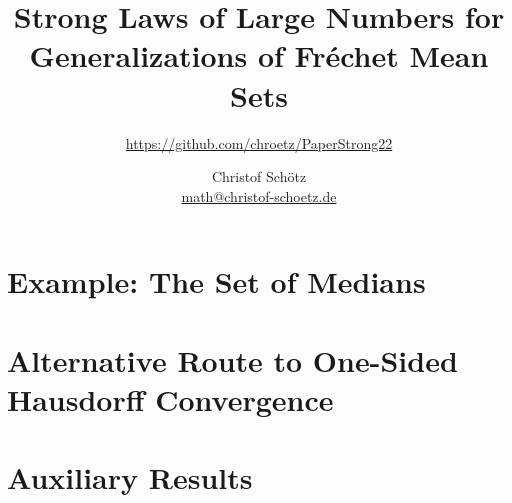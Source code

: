 \documentclass{scrartcl}
\theoremstyle{plain}%
\theoremstyle{definition}
\theoremstyle{remark}
\begin{document}
%
%
%
\title{Strong Laws of Large Numbers for Generalizations of Fréchet Mean Sets}
\subtitle{\url{https://github.com/chroetz/PaperStrong22}}
\author{Christof Schötz\\\href{mailto:math@christof-schoetz.de}{math@christof-schoetz.de}}
\date{}
\maketitle
%
%
%
%
%
%
\begin{abstract} 

\end{abstract}
%





%
%
\begin{appendix}
\section{Example: The Set of Medians}\label{sec:median}

\section{Alternative Route to One-Sided Hausdorff Convergence}\label{sec:alt}

\section{Auxiliary Results}\label{sec:aux}




\end{appendix}
%
%
%
%
%
%
%
%
%
%


%
%
%
\end{document}
